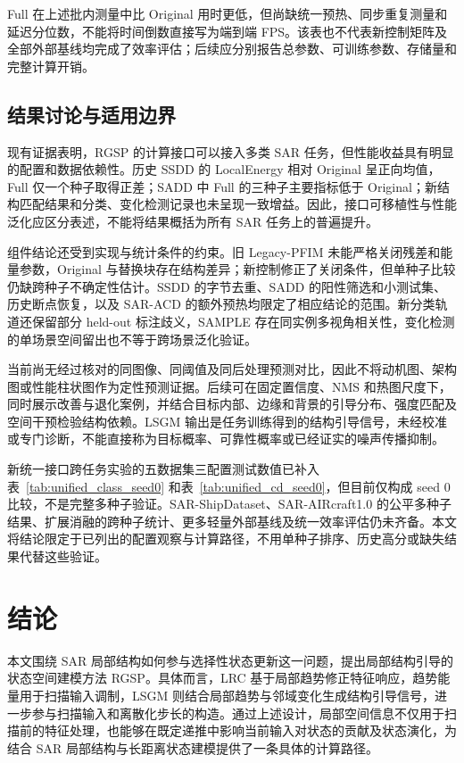 \documentclass[journal]{IEEEtran}
\begin{document}
Full 在上述批内测量中比 Original 用时更低，但尚缺统一预热、同步重复测量和延迟分位数，不能将时间倒数直接写为端到端 FPS。该表也不代表新控制矩阵及全部外部基线均完成了效率评估；后续应分别报告总参数、可训练参数、存储量和完整计算开销。


\subsection{结果讨论与适用边界}
\label{sec:limitations}

现有证据表明，RGSP 的计算接口可以接入多类 SAR 任务，但性能收益具有明显的配置和数据依赖性。历史 SSDD 的 LocalEnergy 相对 Original 呈正向均值，Full 仅一个种子取得正差；SADD 中 Full 的三种子主要指标低于 Original；新结构匹配结果和分类、变化检测记录也未呈现一致增益。因此，接口可移植性与性能泛化应区分表述，不能将结果概括为所有 SAR 任务上的普遍提升。

组件结论还受到实现与统计条件的约束。旧 Legacy-PFIM 未能严格关闭残差和能量参数，Original 与替换块存在结构差异；新控制修正了关闭条件，但单种子比较仍缺跨种子不确定性估计。SSDD 的字节去重、SADD 的阳性筛选和小测试集、历史断点恢复，以及 SAR-ACD 的额外预热均限定了相应结论的范围。新分类轨道还保留部分 held-out 标注歧义，SAMPLE 存在同实例多视角相关性，变化检测的单场景空间留出也不等于跨场景泛化验证。

当前尚无经过核对的同图像、同阈值及同后处理预测对比，因此不将动机图、架构图或性能柱状图作为定性预测证据。后续可在固定置信度、NMS 和热图尺度下，同时展示改善与退化案例，并结合目标内部、边缘和背景的引导分布、强度匹配及空间干预检验结构依赖。LSGM 输出是任务训练得到的结构引导信号，未经校准或专门诊断，不能直接称为目标概率、可靠性概率或已经证实的噪声传播抑制。

新统一接口跨任务实验的五数据集三配置测试数值已补入表~\ref{tab:unified_class_seed0} 和表~\ref{tab:unified_cd_seed0}，但目前仅构成 seed 0 比较，不是完整多种子验证。SAR-ShipDataset、SAR-AIRcraft1.0 的公平多种子结果、扩展消融的跨种子统计、更多轻量外部基线及统一效率评估仍未齐备。本文将结论限定于已列出的配置观察与计算路径，不用单种子排序、历史高分或缺失结果代替这些验证。

\FloatBarrier
\section{结论}
\label{sec:conclusion}

本文围绕 SAR 局部结构如何参与选择性状态更新这一问题，提出局部结构引导的状态空间建模方法 RGSP。具体而言，LRC 基于局部趋势修正特征响应，趋势能量用于扫描输入调制，LSGM 则结合局部趋势与邻域变化生成结构引导信号，进一步参与扫描输入和离散化步长的构造。通过上述设计，局部空间信息不仅用于扫描前的特征处理，也能够在既定递推中影响当前输入对状态的贡献及状态演化，为结合 SAR 局部结构与长距离状态建模提供了一条具体的计算路径。
\end{document}
